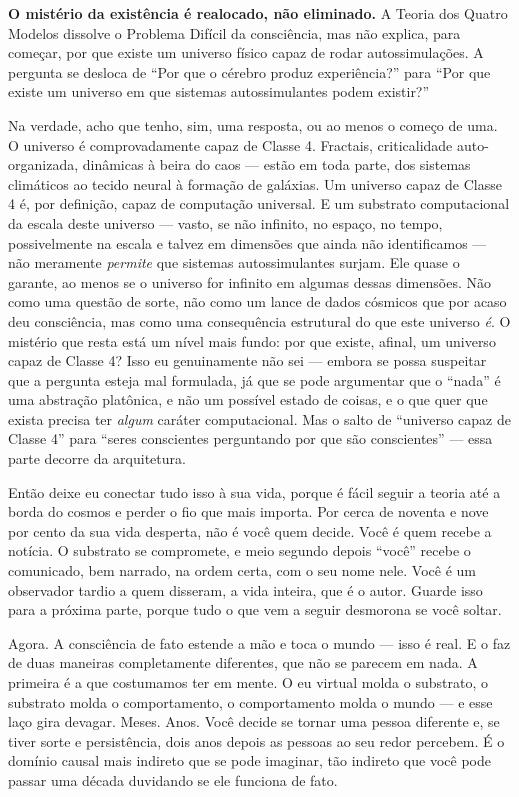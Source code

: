 \documentclass[11pt, twoside, openright]{book}
\begin{document}
\textbf{O mistério da existência é realocado, não eliminado.} A Teoria dos Quatro Modelos dissolve o Problema Difícil da consciência, mas não explica, para começar, por que existe um universo físico capaz de rodar autossimulações. A pergunta se desloca de ``Por que o cérebro produz experiência?'' para ``Por que existe um universo em que sistemas autossimulantes podem existir?''

Na verdade, acho que tenho, sim, uma resposta, ou ao menos o começo de uma. O universo é comprovadamente capaz de Classe 4. Fractais, criticalidade auto-organizada, dinâmicas à beira do caos --- estão em toda parte, dos sistemas climáticos ao tecido neural à formação de galáxias. Um universo capaz de Classe 4 é, por definição, capaz de computação universal. E um substrato computacional da escala deste universo --- vasto, se não infinito, no espaço, no tempo, possivelmente na escala e talvez em dimensões que ainda não identificamos --- não meramente \textit{permite} que sistemas autossimulantes surjam. Ele quase o garante, ao menos se o universo for infinito em algumas dessas dimensões. Não como uma questão de sorte, não como um lance de dados cósmicos que por acaso deu consciência, mas como uma consequência estrutural do que este universo \textit{é}. O mistério que resta está um nível mais fundo: por que existe, afinal, um universo capaz de Classe 4? Isso eu genuinamente não sei --- embora se possa suspeitar que a pergunta esteja mal formulada, já que se pode argumentar que o ``nada'' é uma abstração platônica, e não um possível estado de coisas, e o que quer que exista precisa ter \textit{algum} caráter computacional. Mas o salto de ``universo capaz de Classe 4'' para ``seres conscientes perguntando por que são conscientes'' --- essa parte decorre da arquitetura.

Então deixe eu conectar tudo isso à sua vida, porque é fácil seguir a teoria até a borda do cosmos e perder o fio que mais importa. Por cerca de noventa e nove por cento da sua vida desperta, não é você quem decide. Você é quem recebe a notícia. O substrato se compromete, e meio segundo depois ``você'' recebe o comunicado, bem narrado, na ordem certa, com o seu nome nele. Você é um observador tardio a quem disseram, a vida inteira, que é o autor. Guarde isso para a próxima parte, porque tudo o que vem a seguir desmorona se você soltar.

Agora. A consciência de fato estende a mão e toca o mundo --- isso é real. E o faz de duas maneiras completamente diferentes, que não se parecem em nada. A primeira é a que costumamos ter em mente. O eu virtual molda o substrato, o substrato molda o comportamento, o comportamento molda o mundo --- e esse laço gira devagar. Meses. Anos. Você decide se tornar uma pessoa diferente e, se tiver sorte e persistência, dois anos depois as pessoas ao seu redor percebem. É o domínio causal mais indireto que se pode imaginar, tão indireto que você pode passar uma década duvidando se ele funciona de fato.
\end{document}
